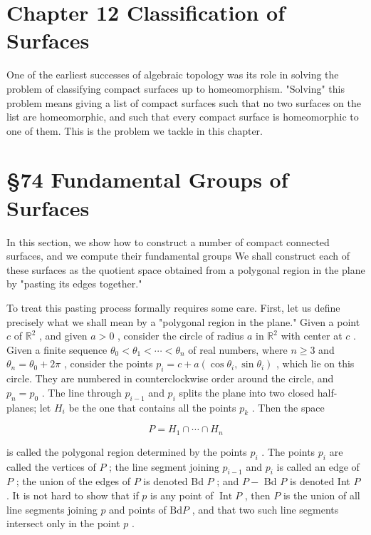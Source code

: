 \documentclass[10pt]{article}
\begin{document}
\section*{Chapter 12 Classification of Surfaces}

One of the earliest successes of algebraic topology was its role in solving the problem of classifying compact surfaces up to homeomorphism. "Solving" this problem means giving a list of compact surfaces such that no two surfaces on the list are homeomorphic, and such that every compact surface is homeomorphic to one of them. This is the problem we tackle in this chapter.

\section*{§74 Fundamental Groups of Surfaces}

In this section, we show how to construct a number of compact connected surfaces, and we compute their fundamental groups We shall construct each of these surfaces as the quotient space obtained from a polygonal region in the plane by "pasting its edges together."

To treat this pasting process formally requires some care. First, let us define precisely what we shall mean by a "polygonal region in the plane." Given a point \(c\) of \({\mathbb{R}}^{2}\) , and given \(a > 0\) , consider the circle of radius \(a\) in \({\mathbb{R}}^{2}\) with center at \(c\) . Given a finite sequence \({\theta }_{0} < {\theta }_{1} < \cdots  < {\theta }_{n}\) of real numbers, where \(n \geq  3\) and \({\theta }_{n} = {\theta }_{0} + {2\pi }\) , consider the points \({p}_{i} = c + a\left( {\cos {\theta }_{i},\sin {\theta }_{i}}\right)\) , which lie on this circle. They are numbered in counterclockwise order around the circle, and \({p}_{n} = {p}_{0}\) . The line through \({p}_{i - 1}\) and \({p}_{i}\) splits the plane into two closed half-planes; let \({H}_{i}\) be the one that contains all the points \({p}_{k}\) . Then the space

\[
P = {H}_{1} \cap  \cdots  \cap  {H}_{n}
\]

is called the polygonal region determined by the points \({p}_{i}\) . The points \({p}_{i}\) are called the vertices of \(P\) ; the line segment joining \({p}_{i - 1}\) and \({p}_{i}\) is called an edge of \(P\) ; the union of the edges of \(P\) is denoted Bd \(P\) ; and \(P -\) Bd \(P\) is denoted Int \(P\) . It is not hard to show that if \(p\) is any point of \(\operatorname{Int}P\) , then \(P\) is the union of all line segments joining \(p\) and points of \(\mathrm{{Bd}}P\) , and that two such line segments intersect only in the point \(p\) .
\end{document}

